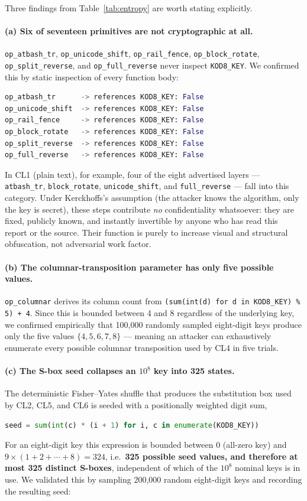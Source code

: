 \documentclass[11pt]{article}
\begin{document}
Three findings from Table~\ref{tab:entropy} are worth stating explicitly.

\paragraph{(a) Six of seventeen primitives are not cryptographic at all.}
\texttt{op\_atbash\_tr}, \texttt{op\_unicode\_shift},
\texttt{op\_rail\_fence}, \texttt{op\_block\_rotate},
\texttt{op\_split\_reverse}, and \texttt{op\_full\_reverse} never inspect
\texttt{KOD8\_KEY}. We confirmed this by static inspection of every
function body:

\begin{lstlisting}[language=Python]
op_atbash_tr      -> references KOD8_KEY: False
op_unicode_shift  -> references KOD8_KEY: False
op_rail_fence     -> references KOD8_KEY: False
op_block_rotate   -> references KOD8_KEY: False
op_split_reverse  -> references KOD8_KEY: False
op_full_reverse   -> references KOD8_KEY: False
\end{lstlisting}

In CL1 (plain text), for example, four of the eight advertised layers —
\texttt{atbash\_tr}, \texttt{block\_rotate}, \texttt{unicode\_shift}, and
\texttt{full\_reverse} — fall into this category. Under Kerckhoffs's
assumption (the attacker knows the algorithm, only the key is secret),
these steps contribute \emph{no} confidentiality whatsoever: they are
fixed, publicly known, and instantly invertible by anyone who has read
this report or the source. Their function is purely to increase visual
and structural obfuscation, not adversarial work factor.

\paragraph{(b) The columnar-transposition parameter has only five possible values.}
\texttt{op\_columnar} derives its column count from
\texttt{(sum(int(d) for d in KOD8\_KEY) \% 5) + 4}. Since this is bounded
between 4 and 8 regardless of the underlying key, we confirmed empirically
that 100{,}000 randomly sampled eight-digit keys produce only the five
values $\{4,5,6,7,8\}$ — meaning an attacker can exhaustively enumerate
every possible columnar transposition used by CL4 in five trials.

\paragraph{(c) The S-box seed collapses an $10^{8}$ key into 325 states.}
The deterministic Fisher–Yates shuffle that produces the substitution
box used by CL2, CL5, and CL6 is seeded with a positionally weighted
digit sum,
\begin{lstlisting}[language=Python]
seed = sum(int(c) * (i + 1) for i, c in enumerate(KOD8_KEY))
\end{lstlisting} For an eight-digit key this expression
is bounded between 0 (all-zero key) and $9\times(1+2+\cdots+8)=324$,
i.e.\ \textbf{325 possible seed values, and therefore at most 325
distinct S-boxes}, independent of which of the $10^{8}$ nominal keys is
in use. We validated this by sampling 200{,}000 random eight-digit keys
and recording the resulting seed:
\end{document}
